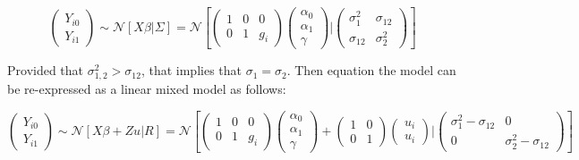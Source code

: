 \documentclass[final, paper=letter,5p,times,twocolumn]{elsarticle}
\theoremstyle{definition}
\begin{document}
\begin{equation*}
  \left(
  \begin{array}{c}
    Y_{i0} \\
    Y_{i1}
  \end{array}
  \right) \sim \mathcal{N} \left[ X\beta | \Sigma \right]= \mathcal{N} \left[
    \left(
    \begin{array}{ccc}
      1 & 0 & 0 \\
      0 & 1 & g_{i}
    \end{array}
    \right)
    \left(
    \begin{array}{c}
      \alpha_{0} \\
      \alpha_{1} \\
      \gamma
    \end{array}
    \right) |
    \left(
    \begin{array}{cc}
      \sigma_{1}^{2} & \sigma_{12} \\
      \sigma_{12}   & \sigma_{2}^{2}
    \end{array}
    \right)
  \right]
\end{equation*}

Provided that $\sigma_{1,2}^{2} > \sigma_{12}$, that implies that $\sigma_{1} = \sigma_{2}$. Then equation the model can be re-expressed as a linear mixed model as follows:

\begin{strip}
\begin{equation*}
  \left(
  \begin{array}{c}
    Y_{i0} \\
    Y_{i1}
  \end{array}
  \right) \sim \mathcal{N} \left[ X\beta + Zu| R \right]= \mathcal{N} \left[
    \left(
    \begin{array}{ccc}
      1 & 0 & 0 \\
      0 & 1 & g_{i}
    \end{array}
    \right)
    \left(
    \begin{array}{c}
      \alpha_{0} \\
      \alpha_{1} \\
      \gamma
    \end{array}
    \right) + \left(
    \begin{array}{cc}
      1 & 0 \\
      0 & 1
    \end{array}
    \right)\left(
    \begin{array}{c}
      u_{i}  \\
      u_{i} 
    \end{array}
    \right)|
    \left(
    \begin{array}{cc}
      \sigma_{1}^{2}-\sigma_{12} & 0 \\
      0                        & \sigma_{2}^{2}-\sigma_{12}
    \end{array}
    \right)
  \right]
\end{equation*}
\end{strip}
\end{document}
